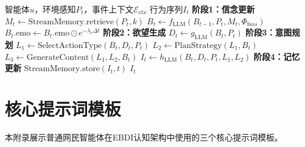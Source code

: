 \documentclass[lettersize,journal]{IEEEtran}
\begin{document}
\begin{algorithm}[!t]
\caption{EBDI认知决策管线}
\label{alg:ebdi}
\begin{algorithmic}[1]
\REQUIRE 智能体$u$，环境感知$P_t$，事件上下文$\mathcal{E}_{ctx}$
\ENSURE 行为序列$I_t$
\STATE \textbf{阶段1：信念更新}
\STATE $M_t \leftarrow \text{StreamMemory.retrieve}(P_t, k)$
\STATE $B_t \leftarrow f_{\text{LLM}}(B_{t-1}, P_t, M_t, \Phi_{bias})$ 
\STATE $B_t.\text{emo} \leftarrow B_t.\text{emo} \odot e^{-\lambda_e \Delta t}$
\STATE \textbf{阶段2：欲望生成}
\STATE $D_t \leftarrow g_{\text{LLM}}(B_t, P_t)$
\STATE \textbf{阶段3：意图规划}
\STATE $L_1 \leftarrow \text{SelectActionType}(B_t, D_t, P_t)$
\STATE $L_2 \leftarrow \text{PlanStrategy}(L_1, B_t)$
\STATE $L_3 \leftarrow \text{GenerateContent}(L_1, L_2, B_t)$
\STATE $I_t \leftarrow h_{\text{LLM}}(B_t, D_t, P_t, L_1, L_2)$
\STATE \textbf{阶段4：记忆更新}
\STATE $\text{StreamMemory.store}(I_t, t)$
\RETURN $I_t$
\end{algorithmic}
\end{algorithm}

\section{核心提示词模板}
\label{app:prompts}

本附录展示普通网民智能体在EBDI认知架构中使用的三个核心提示词模板。
\end{document}
